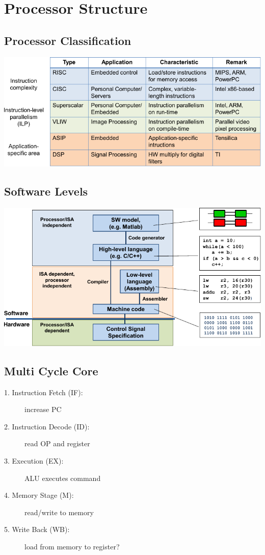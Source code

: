 \section{Processor Structure}

\begin{sectionbox}
	\subsection{Processor Classification}
	\includegraphics[width = \columnwidth]{./img/cpus}
\end{sectionbox}

\begin{sectionbox}
	\subsection{Software Levels}
	\includegraphics[width = \columnwidth]{./img/swlevels}
\end{sectionbox}


\begin{sectionbox}
	\subsection{Multi Cycle Core}
	\begin{description}
		\item[1. Instruction Fetch (IF):] increase PC
		\item[2. Instruction Decode (ID):] read OP and register
		\item[3. Execution (EX):] ALU executes command
		\item[4. Memory Stage (M):] read/write to memory
		\item[5. Write Back (WB):] load from memory to register?
	\end{description}	
\end{sectionbox}


